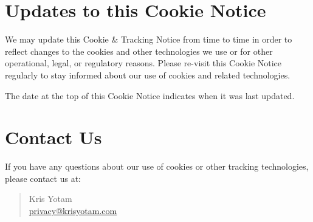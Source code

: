 \documentclass[11pt]{article}
\begin{document}
\section{Updates to this Cookie Notice}
We may update this Cookie \& Tracking Notice from time to time in order to reflect changes to the cookies and other technologies we use or for other operational, legal, or regulatory reasons. Please re-visit this Cookie Notice regularly to stay informed about our use of cookies and related technologies.

The date at the top of this Cookie Notice indicates when it was last updated.

\section{Contact Us}
If you have any questions about our use of cookies or other tracking technologies, please contact us at:

\begin{quote}
  Kris Yotam\\
  \href{mailto:privacy@krisyotam.com}{privacy@krisyotam.com}
\end{quote}
\end{document}
